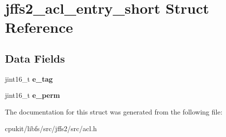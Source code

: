 \hypertarget{structjffs2__acl__entry__short}{}\section{jffs2\+\_\+acl\+\_\+entry\+\_\+short Struct Reference}
\label{structjffs2__acl__entry__short}
\subsection*{Data Fields}
\begin{DoxyCompactItemize}
\item 
\mbox{\label{structjffs2__acl__entry__short_ace3ce4c953d4b64a3553555c9c7bab00}} 
jint16\+\_\+t {\bfseries e\+\_\+tag}
\item 
\mbox{\label{structjffs2__acl__entry__short_a5e3aa19fd619ca31eaa8330e1abe8d30}} 
jint16\+\_\+t {\bfseries e\+\_\+perm}
\end{DoxyCompactItemize}


The documentation for this struct was generated from the following file\+:\begin{DoxyCompactItemize}
\item 
cpukit/libfs/src/jffs2/src/acl.\+h\end{DoxyCompactItemize}
